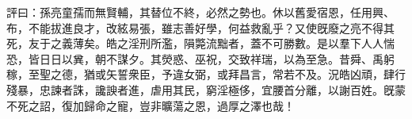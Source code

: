 \begin{pinyinscope}
評曰：孫亮童孺而無賢輔，其替位不終，必然之勢也。休以舊愛宿恩，任用興、布，不能拔進良才，改絃易張，雖志善好學，何益救亂乎？又使旣廢之亮不得其死，友于之義薄矣。皓之淫刑所濫，隕斃流黜者，蓋不可勝數。是以羣下人人惴恐，皆日日以兾，朝不謀夕。其熒惑、巫祝，交致祥瑞，以為至急。昔舜、禹躬稼，至聖之德，猶或矢誓衆臣，予違女弼，或拜昌言，常若不及。況皓凶頑，肆行殘暴，忠諫者誅，讒諛者進，虐用其民，窮淫極侈，宜腰首分離，以謝百姓。旣蒙不死之詔，復加歸命之寵，豈非曠蕩之恩，過厚之澤也哉！



\end{pinyinscope}
